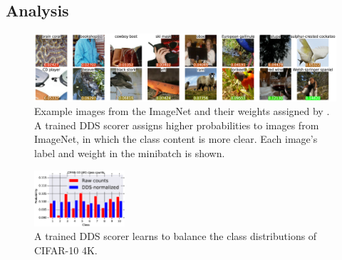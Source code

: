 


\subsection{Analysis}
\begin{figure}
    \includegraphics[width=\textwidth]{figs/imagenet_dds.eps}
  \caption{\label{fig:dds_score} Example images from the ImageNet and their weights assigned by \dds. A trained DDS scorer assigns higher probabilities to images from ImageNet, in which the class content is more clear. Each image's label and weight in the minibatch is shown.}
\end{figure}

\begin{figure}
  \centering
    \includegraphics[width=0.3\textwidth]{figs/cifar10_dds.eps}
  \caption{\label{fig:dds_distribution}A trained DDS scorer learns to balance the class distributions of CIFAR-10 4K.}
\end{figure}


